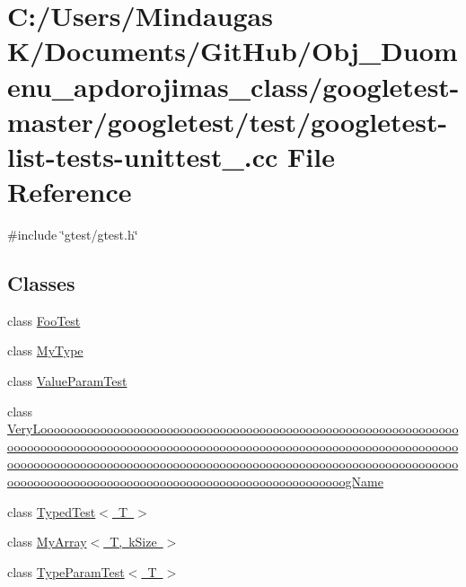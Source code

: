 \hypertarget{googletest-master_2googletest_2test_2googletest-list-tests-unittest___8cc}{}\section{C\+:/\+Users/\+Mindaugas K/\+Documents/\+Git\+Hub/\+Obj\+\_\+\+Duomenu\+\_\+apdorojimas\+\_\+class/googletest-\/master/googletest/test/googletest-\/list-\/tests-\/unittest\+\_\+.cc File Reference}
\label{googletest-master_2googletest_2test_2googletest-list-tests-unittest___8cc}
{\ttfamily \#include \char`\"{}gtest/gtest.\+h\char`\"{}}\newline
\subsection*{Classes}
\begin{DoxyCompactItemize}
\item 
class \mbox{\hyperlink{class_foo_test}{Foo\+Test}}
\item 
class \mbox{\hyperlink{class_my_type}{My\+Type}}
\item 
class \mbox{\hyperlink{class_value_param_test}{Value\+Param\+Test}}
\item 
class \mbox{\hyperlink{class_very_loooooooooooooooooooooooooooooooooooooooooooooooooooooooooooooooooooooooooooooooooooo570db76e21fa868abfe0f6323a68c9ba}{Very\+Loooooooooooooooooooooooooooooooooooooooooooooooooooooooooooooooooooooooooooooooooooooooooooooooooooooooooooooooooooooooooooooooooooooooooooooooooooooooooooooooooooooooooooooooooooooooooooooooooooooooooooooooooooooooooooooooooooooooooooooooooooooooooog\+Name}}
\item 
class \mbox{\hyperlink{class_typed_test}{Typed\+Test$<$ T $>$}}
\item 
class \mbox{\hyperlink{class_my_array}{My\+Array$<$ T, k\+Size $>$}}
\item 
class \mbox{\hyperlink{class_type_param_test}{Type\+Param\+Test$<$ T $>$}}
\end{DoxyCompactItemize}
